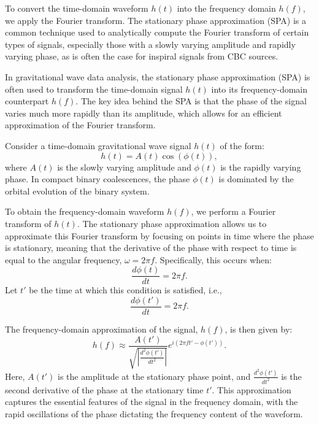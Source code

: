 To convert the time-domain waveform $h(t)$ into the frequency domain $h(f)$, we apply the Fourier transform. The stationary phase approximation (SPA) is a common technique used to analytically compute the Fourier transform of certain types of signals, especially those with a slowly varying amplitude and rapidly varying phase, as is often the case for inspiral signals from CBC sources.

In gravitational wave data analysis, the stationary phase approximation (SPA) is often used to transform the time-domain signal $h(t)$ into its frequency-domain counterpart $h(f)$. The key idea behind the SPA is that the phase of the signal varies much more rapidly than its amplitude, which allows for an efficient approximation of the Fourier transform.

Consider a time-domain gravitational wave signal $h(t)$ of the form:
\begin{equation}
    h(t) = A(t) \cos(\phi(t)),
\end{equation}
where $A(t)$ is the slowly varying amplitude and $\phi(t)$ is the rapidly varying phase. In compact binary coalescences, the phase $\phi(t)$ is dominated by the orbital evolution of the binary system.

To obtain the frequency-domain waveform $h(f)$, we perform a Fourier transform of $h(t)$. The stationary phase approximation allows us to approximate this Fourier transform by focusing on points in time where the phase is stationary, meaning that the derivative of the phase with respect to time is equal to the angular frequency, $\omega = 2 \pi f$. Specifically, this occurs when:
\begin{equation}
    \frac{d\phi(t)}{dt} = 2 \pi f.
\end{equation}
Let \( t' \) be the time at which this condition is satisfied, i.e., 
\[
    \frac{d\phi(t')}{dt} = 2 \pi f.
\]

The frequency-domain approximation of the signal, $h(f)$, is then given by:
\begin{equation}
    h(f) \approx \frac{A(t')}{\sqrt{\left| \frac{d^2 \phi(t')}{dt^2} \right|}} e^{i \left( 2 \pi f t' - \phi(t') \right)}.
\end{equation}
Here, \( A(t') \) is the amplitude at the stationary phase point, and \( \frac{d^2 \phi(t')}{dt^2} \) is the second derivative of the phase at the stationary time \( t' \). This approximation captures the essential features of the signal in the frequency domain, with the rapid oscillations of the phase dictating the frequency content of the waveform.

